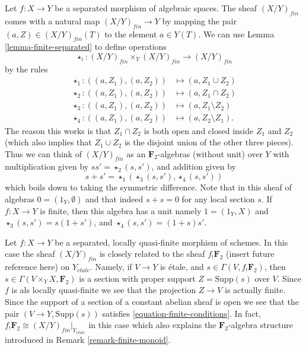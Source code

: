 \begin{remark}
\label{remark-finite-monoid}
Let $f : X \to Y$ be a separated morphism of algebraic spaces.
The sheaf $(X/Y)_{fin}$ comes with a natural map
$(X/Y)_{fin} \to Y$ by mapping the pair $(a, Z) \in (X/Y)_{fin}(T)$
to the element $a \in Y(T)$. We can use
Lemma \ref{lemma-finite-separated}
to define operations
$$
\star_i : (X/Y)_{fin} \times_Y (X/Y)_{fin} \longrightarrow (X/Y)_{fin}
$$
by the rules
\begin{align*}
\star_1 : ((a, Z_1), (a, Z_2)) & \longmapsto (a, Z_1 \cup Z_2) \\
\star_2 : ((a, Z_1), (a, Z_2)) & \longmapsto (a, Z_1 \cap Z_2) \\
\star_3 : ((a, Z_1), (a, Z_2)) & \longmapsto (a, Z_1 \setminus Z_2) \\
\star_4 : ((a, Z_1), (a, Z_2)) & \longmapsto (a, Z_2 \setminus Z_1).
\end{align*}
The reason this works is that $Z_1 \cap Z_2$ is both open and closed
inside $Z_1$ and $Z_2$ (which also implies that $Z_1 \cup Z_2$ is
the disjoint union of the other three pieces).
Thus we can think of $(X/Y)_{fin}$ as an $\mathbf{F}_2$-algebras
(without unit) over $Y$ with multiplication given by
$ss' = \star_2(s, s')$, and addition given by
$$
s + s' = \star_1(\star_3(s, s'), \star_4(s, s'))
$$
which boils down to taking the symmetric difference.
Note that in this sheaf of algebras $0 = (1_Y, \emptyset)$
and that indeed $s + s = 0$ for any local section $s$.
If $f : X \to Y$ is finite, then this algebra has a unit namely
$1 = (1_Y, X)$ and $\star_3(s, s') = s(1 + s')$, and
$\star_4(s, s') = (1 + s)s'$.
\end{remark}

\begin{remark}
\label{remark-finite-quasi-finite-separated-morphism-schemes}
Let $f : X \to Y$ be a separated, locally quasi-finite
morphism of schemes. In this case the sheaf $(X/Y)_{fin}$
is closely related to the sheaf $f_!\mathbf{F}_2$
(insert future reference here) on $Y_{\acute{e}tale}$.
Namely, if $V \to Y$ is \'etale, and $s \in \Gamma(V, f_!\mathbf{F}_2)$,
then $s \in \Gamma(V \times_Y X, \mathbf{F}_2)$ is a section
with proper support $Z = \text{Supp}(s)$ over $V$. Since $f$ is
als locally quasi-finite we see that the projection $Z \to V$ is actually
finite. Since the support of a section of a constant abelian sheaf is open
we see that the pair $(V \to Y, \text{Supp}(s))$ satisfies
\ref{equation-finite-conditions}.
In fact, $f_!\mathbf{F}_2 \cong (X/Y)_{fin}|_{Y_{\acute{e}tale}}$
in this case which also explains the $\mathbf{F}_2$-algebra structure
introduced in Remark \ref{remark-finite-monoid}.
\end{remark}

